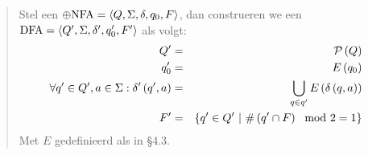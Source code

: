 \documentclass{article}
\begin{document}
\begin{question}
\begin{answer}
\begin{enumerate}
 \begin{quote}
 \begin{construction}
 Stel een $\oplus\mbox{NFA}=\left\langle Q,\Sigma,\delta,q_0,F \right\rangle$, dan construeren we een $\mbox{DFA}=\left\langle Q',\Sigma,\delta',q_0',F' \right\rangle$ als volgt:
 \begin{eqnarray}
  Q'&=&\mathcal{P}\left( Q \right)\\
  q_0'&=&E\left( q_0 \right)\\
  \forall q'\in Q',a\in\Sigma:\delta'\left( q',a \right)&=&\displaystyle\bigcup_{q\in q'}E\left( \delta\left( q,a \right) \right)\\
  F'&=&\left\{ q'\in Q'\ |\ \#\left( q'\cap F \right)\mod 2=1 \right\}
 \end{eqnarray}
 Met $E$ gedefinieerd als in \S4.3.
 \end{construction}
 \end{quote}

\end{enumerate}

\end{answer}
\end{question}
\end{document}
